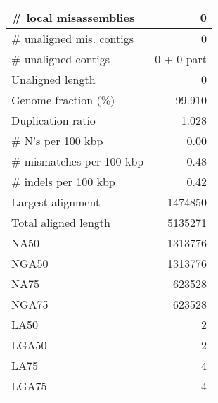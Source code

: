 \documentclass[12pt,a4paper]{article}
\begin{document}
\begin{table}[ht]
\begin{center}
\begin{tabular}{|l*{1}{|r}|}
\# local misassemblies & 0 \\ \hline
\# unaligned mis. contigs & 0 \\ \hline
\# unaligned contigs & 0 + 0 part \\ \hline
Unaligned length & 0 \\ \hline
Genome fraction (\%) & 99.910 \\ \hline
Duplication ratio & 1.028 \\ \hline
\# N's per 100 kbp & 0.00 \\ \hline
\# mismatches per 100 kbp & 0.48 \\ \hline
\# indels per 100 kbp & 0.42 \\ \hline
Largest alignment & 1474850 \\ \hline
Total aligned length & 5135271 \\ \hline
NA50 & 1313776 \\ \hline
NGA50 & 1313776 \\ \hline
NA75 & 623528 \\ \hline
NGA75 & 623528 \\ \hline
LA50 & 2 \\ \hline
LGA50 & 2 \\ \hline
LA75 & 4 \\ \hline
LGA75 & 4 \\ \hline
\end{tabular}
\end{center}
\end{table}
\end{document}
